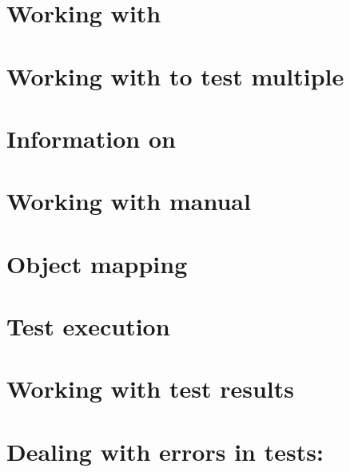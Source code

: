 \clearpage

\section{Working with \gdsuites{}}
\label{WorkingWithSuites}


\clearpage 

\section{Working with \gdjobs{} to test multiple \gdauts{}}
\label{WorkingWithJobs}


\clearpage 

\section{Information on \gdsteps{}}


\section{Working with manual \gdcases{}}


\clearpage

\section{Object mapping}


\clearpage

\section{Test execution}


\clearpage

\section{Working with test results}


\clearpage

\section{Dealing with errors in tests: \gdehandlers{}}
\label{customizedehandler}


